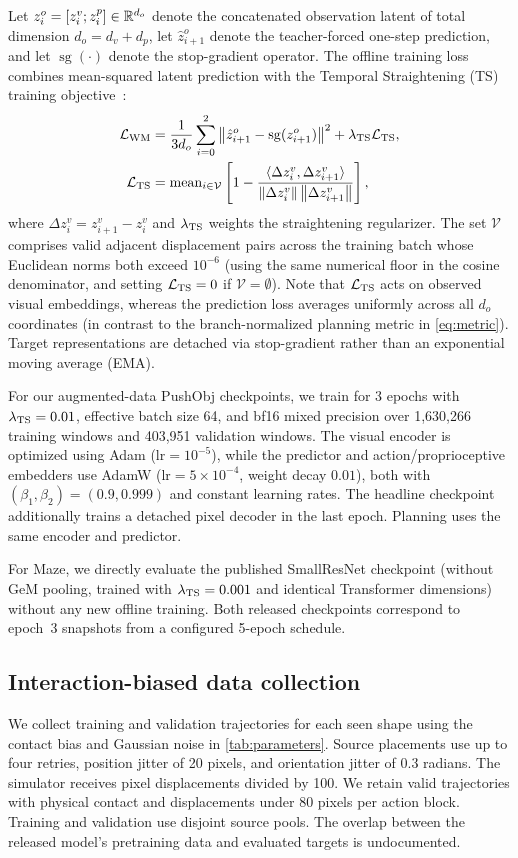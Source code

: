 Let $z_i^o=[z_i^v;z_i^p]\in\mathbb{R}^{d_o}$ denote the concatenated observation latent of total dimension $d_o=d_v+d_p$, let $\hat z_{i+1}^o$ denote the teacher-forced one-step prediction, and let $\operatorname{sg}(\cdot)$ denote the stop-gradient operator. The offline training loss combines mean-squared latent prediction with the Temporal Straightening (TS) training objective~\cite{wang2026straightening}:
\begin{align}
 \mathcal L_{\rm WM}&=\frac{1}{3d_o}\sum_{i=0}^{2}
 \left\lVert\hat z_{i+1}^o-\operatorname{sg}(z_{i+1}^o)\right\rVert^2
 +\lambda_{\rm TS}\mathcal L_{\rm TS},\\
 \mathcal L_{\rm TS}&=\operatorname{mean}_{i\in\mathcal V}
 \left[1-\frac{\langle\Delta z_i^v,\Delta z_{i+1}^v\rangle}
 {\left\lVert\Delta z_i^v\right\rVert\left\lVert\Delta z_{i+1}^v\right\rVert}\right],
\end{align}
where $\Delta z_i^v=z_{i+1}^v-z_i^v$ and $\lambda_{\rm TS}$ weights the straightening regularizer. The set $\mathcal V$ comprises valid adjacent displacement pairs across the training batch whose Euclidean norms both exceed $10^{-6}$ (using the same numerical floor in the cosine denominator, and setting $\mathcal L_{\rm TS}=0$ if $\mathcal V=\emptyset$). Note that $\mathcal L_{\rm TS}$ acts on observed visual embeddings, whereas the prediction loss averages uniformly across all $d_o$ coordinates (in contrast to the branch-normalized planning metric in \cref{eq:metric}). Target representations are detached via stop-gradient rather than an exponential moving average (EMA).

For our augmented-data PushObj checkpoints, we train for 3 epochs with $\lambda_{\rm TS}=0.01$, effective batch size 64, and bf16 mixed precision over 1,630,266 training windows and 403,951 validation windows. The visual encoder is optimized using Adam ($\text{lr}=10^{-5}$), while the predictor and action/proprioceptive embedders use AdamW ($\text{lr}=5\times10^{-4}$, weight decay $0.01$), both with $(\beta_1,\beta_2)=(0.9,0.999)$ and constant learning rates. The headline checkpoint additionally trains a detached pixel decoder in the last epoch. Planning uses the same encoder and predictor.

For Maze, we directly evaluate the published SmallResNet checkpoint (without GeM pooling, trained with $\lambda_{\rm TS}=0.001$ and identical Transformer dimensions) without any new offline training. Both released checkpoints correspond to epoch~3 snapshots from a configured 5-epoch schedule.

\subsection{Interaction-biased data collection}
We collect training and validation trajectories for each seen shape using the contact bias and Gaussian noise in \cref{tab:parameters}. Source placements use up to four retries, position jitter of 20 pixels, and orientation jitter of 0.3 radians. The simulator receives pixel displacements divided by 100. We retain valid trajectories with physical contact and displacements under 80 pixels per action block. Training and validation use disjoint source pools. The overlap between the released model's pretraining data and evaluated targets is undocumented.

